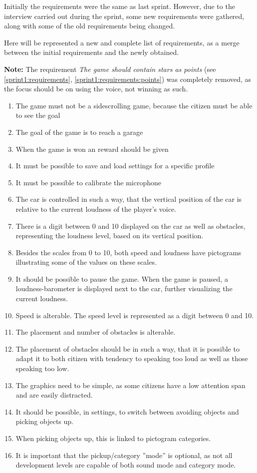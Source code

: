Initially the requirements were the same as last sprint.
However, due to the interview carried out during the sprint, some new requirements were gathered, along with some of the old requirements being changed.

Here will be represented a new and complete list of requirements, as a merge between the initial requirements and the newly obtained.

\textbf{Note:} The requirement \textit{The game should contain stars as points} (see \cref{sprint1:requirements}, \cref{sprint1:requirements:points}) was completely removed, as the focus should be on using the voice, not winning as such.

\begin{enumerate}
\item The game must not be a sidescrolling game, because the citizen must be able to see the goal
\item The goal of the game is to reach a garage
\item When the game is won an reward should be given \label{sprint2:requirements:reward}
\item It must be possible to save and load settings for a specific profile
\item It must be possible to calibrate the microphone 
\item \label{carcontrolReq} The car is controlled in such a way, that the vertical position of the car is relative to the current loudness of the player's voice.
\item There is a digit between 0 and 10 displayed on the car as well as obstacles, representing the loudness level, based on its vertical position. 
\item Besides the scales from 0 to 10, both speed and loudness have pictograms illustrating some of the values on these scales.
\item It should be possible to pause the game. When the game is paused, a loudness-barometer is displayed next to the car, further visualizing the current loudness. \label{sprint2:requirements:pause}
\item Speed is alterable. The speed level is represented as a digit between 0 and 10.
\item The placement and number of obstacles is alterable.
\item The placement of obstacles should be in such a way, that it is possible to adapt it to both citizen with tendency to speaking too loud as well as those speaking too low.
\item \label{graphicsReq} The graphics need to be simple, as some citizens have a low attention span and are easily distracted.
\item It should be possible, in settings, to switch between avoiding objects and picking objects up.
\item When picking objects up, this is linked to pictogram categories.
\item It is important that the pickup/category ''mode'' is optional, as not all development levels are capable of both sound mode and category mode.
\end{enumerate}